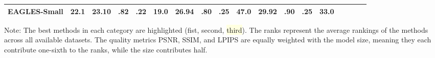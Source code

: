 {\begin{minipage}{\textheight}
\begin{adjustbox}{center}
\begin{tabular}{ll|lllr|lllr|lllr|lllr}
EAGLES-Small & 22.1 & 23.10 & .82 & .22 & 19.0 & 26.94 & .80 & .25 & 47.0 & 29.92 & .90 & .25 & 33.0 &  &  &  &  \\
\bottomrule
\end{tabular}
        \end{adjustbox}
        \newline\newline
        \noindent Note: The best methods in each category are highlighted (\colorbox{lightred}{fist}, \colorbox{lightorange}{second}, \colorbox{lightyellow}{third}). The ranks represent the average rankings of the methods across all available datasets. The quality metrics PSNR, SSIM, and LPIPS are equally weighted with the model size, meaning they each contribute one-sixth to the ranks, while the size contributes half.

    \end{minipage}
}